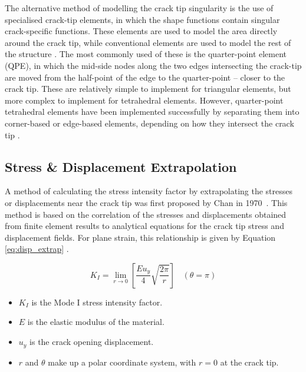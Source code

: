 The alternative method of modelling the crack tip singularity is the use of specialised crack-tip elements, in which the shape functions contain singular crack-specific functions. These elements are used to model the area directly around the crack tip, while conventional elements are used to model the rest of the structure \cite{kuna_finite_2013}. The most commonly used of these is the quarter-point element (QPE), in which the mid-side nodes along the two edges intersecting the crack-tip are moved from the half-point of the edge to the quarter-point -- closer to the crack tip. These are relatively simple to implement for triangular elements, but more complex to implement for tetrahedral elements. However, quarter-point tetrahedral elements have been implemented successfully by separating them into corner-based or edge-based elements, depending on how they intersect the crack tip \cite{nejati_use_2015}.
	
\subsection{Stress \& Displacement Extrapolation}

A method of calculating the stress intensity factor by extrapolating the stresses or displacements near the crack tip was first proposed by Chan in 1970\ \cite{chan_finite_1970}. This method is based on the correlation of the stresses and displacements obtained from finite element results to analytical equations for the crack tip stress and displacement fields. For plane strain, this relationship is given by Equation \ref{eq:disp_extrap} \cite{anderson_fracture_2017}.

\begin{equation}
    K_I = \lim_{r\rightarrow0} \left[\frac{E u_y}{4} \sqrt{\frac{2 \pi}{r}} \right]\ \ \ \ (\theta = \pi)
    \label{eq:disp_extrap}
\end{equation}

\begin{itemize}
	\item $K_I$ is the Mode I stress intensity factor.
	\item $E$ is the elastic modulus of the material.
	\item $u_y$ is the crack opening displacement.
	\item $r$ and $\theta$ make up a polar coordinate system, with $r=0$ at the crack tip.
\end{itemize}

